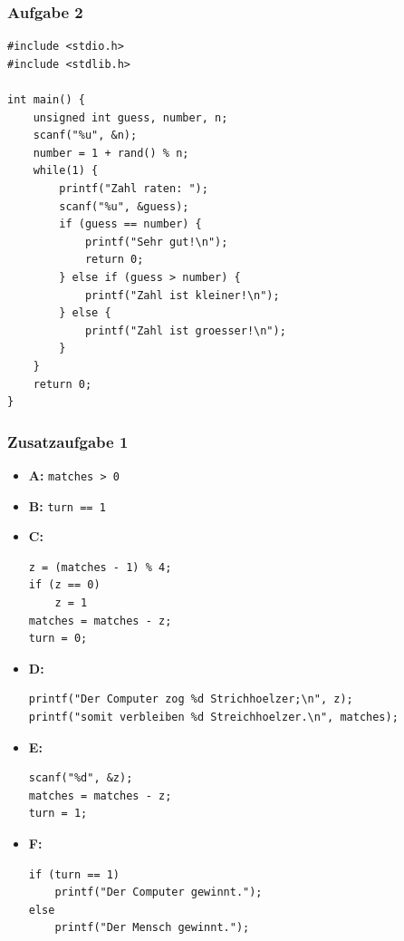 \documentclass{beamer}
\newcommand*{\ttfamilywithbold}{\fontfamily{lmtt}\selectfont}
\begin{document}
\begin{frame}[fragile] \frametitle{Aufgabe 2}
	\begin{lstlisting}[style=frame, showstringspaces=false, basicstyle=\ttfamilywithbold\scriptsize]
#include <stdio.h>
#include <stdlib.h>

int main() {
	unsigned int guess, number, n;
	scanf("%u", &n);
	number = 1 + rand() % n;
	while(1) {
		printf("Zahl raten: ");
		scanf("%u", &guess);
		if (guess == number) {
			printf("Sehr gut!\n");
			return 0;
		} else if (guess > number) {
			printf("Zahl ist kleiner!\n");
		} else {
			printf("Zahl ist groesser!\n");
		}
	}
	return 0;
}
	\end{lstlisting}%
\end{frame}

\begin{frame}[fragile] \frametitle{Zusatzaufgabe 1}
	\footnotesize
	\begin{itemize}
		\item \textbf{A:} \lstinline|matches > 0|
		\item \textbf{B:} \lstinline|turn == 1|
		\item \textbf{C:} 
		\begin{lstlisting}[basicstyle=\ttfamilywithbold\tiny, numbers=none]
z = (matches - 1) % 4;
if (z == 0)
	z = 1
matches = matches - z;
turn = 0;
		\end{lstlisting}
	\item \textbf{D:} 
	\begin{lstlisting}[basicstyle=\ttfamilywithbold\tiny, numbers=none]
printf("Der Computer zog %d Strichhoelzer;\n", z);
printf("somit verbleiben %d Streichhoelzer.\n", matches);
	\end{lstlisting}
	\item \textbf{E:} 
	\begin{lstlisting}[basicstyle=\ttfamilywithbold\tiny, numbers=none]
scanf("%d", &z);
matches = matches - z;
turn = 1;
	\end{lstlisting}
	\item \textbf{F:}
	\begin{lstlisting}[basicstyle=\ttfamilywithbold\tiny, numbers=none]
if (turn == 1)
	printf("Der Computer gewinnt.");
else
	printf("Der Mensch gewinnt.");
	\end{lstlisting}
	\end{itemize}
\end{frame}
\end{document}
